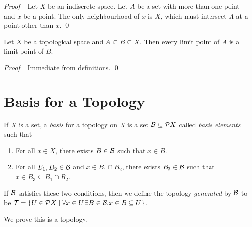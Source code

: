 \begin{proof}
    \pf\ Let $X$ be an indiscrete space. Let $A$ be a set with more than one point and $x$ be a point.
    The only neighbourhood of $x$ is $X$, which must intersect $A$ at a point other than $x$. \qed
\end{proof}

\begin{lemma}
    \label{lemma:limit_point_subset}
    Let $X$ be a topological space and $A \subseteq B \subseteq X$. Then every limit
    point of $A$ is a limit point of $B$.
\end{lemma}

\begin{proof}
    \pf\ Immediate from definitions. \qed
\end{proof}

\section{Basis for a Topology}

\begin{definition}[Basis]
    If $X$ is a set, a \emph{basis} for a topology on $X$ is a set $\mathcal{B} \subseteq \mathcal{P} X$ called \emph{basis elements} such that
    \begin{enumerate}
        \item For all $x \in X$, there exists $B \in \mathcal{B}$ such that $x \in B$.
        \item For all $B_1, B_2 \in \mathcal{B}$ and $x \in B_1 \cap B_2$, there exists $B_3 \in \mathcal{B}$ such that
        $x \in B_3 \subseteq B_1 \cap B_2$.
    \end{enumerate}

    If $\mathcal{B}$ satisfies these two conditions, then we define the topology \emph{generated} by $\mathcal{B}$ to be
    $\mathcal{T} = \{ U \in \mathcal{P} X \mid \forall x \in U. \exists B \in \mathcal{B}. x \in B \subseteq U \}$.
\end{definition}

We prove this is a topology.

